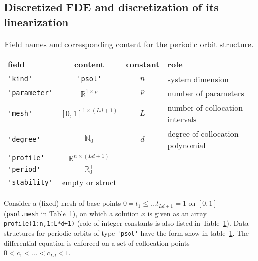 \documentclass[11pt]{scrartcl}
\newcommand{\blist}[1]{\mbox{\lstinline!#1!}}
\newcommand{\R}{\mathbb{R}}
\newcommand{\N}{\mathbb{N}}
\begin{document}
\subsection*{Discretized FDE and discretization of its linearization}
\begin{table}[ht]\centering
  \begin{tabular}[t]{lc@{\qquad}cl}\hline\noalign{\smallskip}
    field     & content    &   constant & role    \\\hline \noalign{\smallskip}
    \blist{'kind'}      & \blist{'psol'}   &
    $n$ & system dimension\\[0.5ex]
    \blist{'parameter'} & $\R^{1\times p}$ & $p$ & number of parameters\\[0.5ex]
    \blist{'mesh'}      & $[0,1]^{1\times (Ld+1)}$ 
    & $L$ & number of collocation intervals\\[0.5ex]
    \blist{'degree'}    & $\N_0$        &
    $d$ & degree of collocation polynomial\\[0.5ex]
    \blist{'profile'}   & $\R^{n\times (Ld+1)}$ \\[0.5ex]
    \blist{'period'}    & $\R^+_0$         \\[0.5ex]
    \blist{'stability'} & empty or struct  \\\hline
  \end{tabular}
  \caption{Field names and corresponding content for the 
    periodic orbit structure.}\label{tab:psol}
\end{table}
Consider a (fixed) mesh of base points $0= t_1\leq\ldots
t_{Ld+1}=1$ on $[0,1]$ (\blist{psol.mesh} in Table~\ref{tab:psol}), on
which a solution $x$ is given as an array \blist{profile(1:n,1:L*d+1)}
(role of integer constants is also listed in
Table~\ref{tab:psol}). Data structures for periodic orbits of type
\blist{'psol'} have the form show in table~\ref{tab:psol}. The
differential equation is enforced on a set of collocation points
$0<c_1<\ldots <c_{Ld}<1$. 
\end{document}
